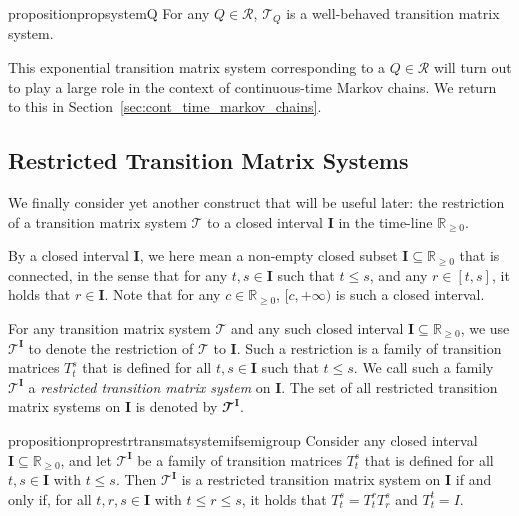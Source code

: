 \documentclass[10pt,a4paper]{paper}
\theoremstyle{definition}
\newcommand{\reals}{\mathbb{R}}
\newcommand{\realsnonneg}{\reals_{\geq 0}}
\begin{document}
\begin{restatable}{proposition}{propsystemQ}
\label{prop:systemQ}
For any $Q\in\mathcal{R}$, $\mathcal{T}_Q$ is a well-behaved transition matrix system.
\end{restatable}

This exponential transition matrix system corresponding to a $Q\in\mathcal{R}$ will turn out to play a large role in the context of continuous-time Markov chains. We return to this in Section~\ref{sec:cont_time_markov_chains}.

\subsection{Restricted Transition Matrix Systems}\label{sec:restricted}

We finally consider yet another construct that will be useful later: the restriction of a transition matrix system $\mathcal{T}$ to a closed interval $\mathbf{I}$ in the time-line $\realsnonneg$. \label{notation:restricted_system}

By a closed interval $\mathbf{I}$, we here mean a non-empty closed subset $\mathbf{I}\subseteq\realsnonneg$ that is connected, in the sense that for any $t,s\in\mathbf{I}$ such that $t\leq s$, and any $r\in[t,s]$, it holds that $r\in\mathbf{I}$. Note that for any $c\in\realsnonneg$, $[c,+\infty)$ is such a closed interval.

For any transition matrix system $\mathcal{T}$ and any such closed interval $\mathbf{I}\subseteq\realsnonneg$, we use $\mathcal{T}^\mathbf{I}$ to denote the restriction of $\mathcal{T}$ to $\mathbf{I}$. Such a restriction is a family of transition matrices $T_t^s$ that is defined for all $t,s\in\mathbf{I}$ such that $t\leq s$.
We call such a family $\mathcal{T}^{\mathbf{I}}$ a \emph{restricted transition matrix system} on $\mathbf{I}$. The set of all restricted transition matrix systems on $\mathbf{I}$ is denoted by $\mathbfcal{T}^{\mathbf{I}}$.


\begin{restatable}{proposition}{proprestrtransmatsystemifsemigroup}
\label{prop:restr_trans_mat_system_if_semigroup}
Consider any closed interval $\mathbf{I}\subseteq\realsnonneg$, and let $\mathcal{T}^{\mathbf{I}}$ be a family of transition matrices $T_t^s$ that is defined for all $t,s\in\mathbf{I}$ with $t\leq s$. Then $\mathcal{T}^{\mathbf{I}}$ is a restricted transition matrix system on $\mathbf{I}$ if and only if, for all $t,r,s\in\mathbf{I}$ with $t\leq r\leq s$, it holds that $T_t^s = T_t^rT_r^s$ and $T_t^t=I$.
\end{restatable}
\end{document}
